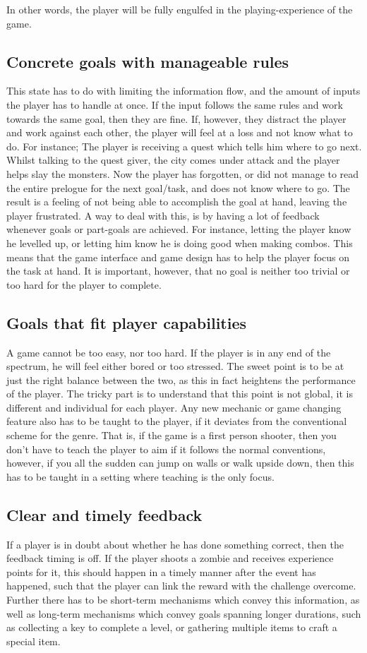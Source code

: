 In other words, the player will be fully engulfed in the playing-experience of the game.

\subsection{Concrete goals with manageable rules}
This state has to do with limiting the information flow, and the amount of inputs the player has to handle at once. If the input follows the same rules and work towards the same goal, then they are fine. If, however, they distract the player and work against each other, the player will feel at a loss and not know what to do. For instance; The player is receiving a quest which tells him where to go next. Whilst talking to the quest giver, the city comes under attack and the player helps slay the monsters. Now the player has forgotten, or did not manage to read the entire prelogue for the next goal/task, and does not know where to go. The result is a feeling of not being able to accomplish the goal at hand, leaving the player frustrated.
A way to deal with this, is by having a lot of feedback whenever goals or part-goals are achieved. For instance, letting the player know he levelled up, or letting him know he is doing good when making combos. This means that the game interface and game design has to help the player focus on the task at hand. It is important, however, that no goal is neither too trivial or too hard for the player to complete.

\subsection{Goals that fit player capabilities}
A game cannot be too easy, nor too hard. If the player is in any end of the spectrum, he will feel either bored or too stressed. The sweet point is to be at just the right balance between the two, as this in fact heightens the performance of the player. The tricky part is to understand that this point is not global, it is different and individual for each player. Any new mechanic or game changing feature also has to be taught to the player, if it deviates from the conventional scheme for the genre. That is, if the game is a first person shooter, then you don't have to teach the player to aim if it follows the normal conventions, however, if you all the sudden can jump on walls or walk upside down, then this has to be taught in a setting where teaching is the only focus.

\subsection{Clear and timely feedback}
If a player is in doubt about whether he has done something correct, then the feedback timing is off. If the player shoots a zombie and receives experience points for it, this should happen in a timely manner after the event has happened, such that the player can link the reward with the challenge overcome. Further there has to be short-term mechanisms which convey this information, as well as long-term mechanisms which convey goals spanning longer durations, such as collecting a key to complete a level, or gathering multiple items to craft a special item.

